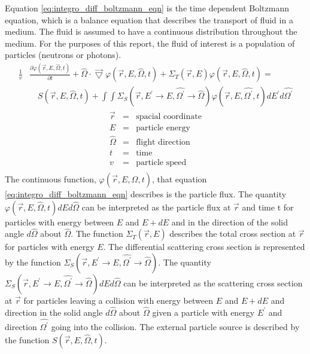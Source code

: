 Equation \ref{eq:integro_diff_boltzmann_eqn} is the time dependent Boltzmann
equation, which is a balance equation that describes the transport of fluid
in a medium. The fluid is assumed to have a continuous distribution throughout
the medium. For the purposes of this report, the fluid of interest is a
population of particles (neutrons or photons). 
\begin{equation}
  \begin{split}
    \frac{1}{v}&\frac{\partial \varphi(\vec{r},E,\hat{\Omega},t)}{\partial t} +
    \hat{\Omega} \cdot \vec{\bigtriangledown} \varphi(\vec{r},E,\hat{\Omega},t)
    + \Sigma_T(\vec{r},E) \varphi(\vec{r},E,\hat{\Omega},t) = \\
    & \quad S(\vec{r},E,\hat{\Omega},t) +
    \int\int \Sigma_S(\vec{r},E^{'} \to E,\hat{\Omega^{'}} \to \hat{\Omega})
    \varphi(\vec{r},E,\hat{\Omega^{'}},t) dE^{'}d\hat{\Omega^{'}} 
  \end{split}
  \label{eq:integro_diff_boltzmann_eqn}
\end{equation}
\begin{eqnarray*}
  \vec{r} & = & \text{spacial coordinate} \nonumber \\
  E & = & \text{particle energy} \nonumber \\
  \hat{\Omega} & = & \text{flight direction} \nonumber \\
  t & = & \text{time} \nonumber \\
  v & = & \text{particle speed} \nonumber \\
\end{eqnarray*}
The continuous function, $\varphi(\vec{r},E,\hat{\Omega},t)$, that equation 
\ref{eq:integro_diff_boltzmann_eqn} describes is the particle flux. The
quantity $\varphi(\vec{r},E,\hat{\Omega},t)dEd\hat{\Omega}$ can be interpreted
as the particle flux at $\vec{r}$ and time t for particles with energy between
$E$ and $E + dE$ and in the direction of the solid angle $d\hat{\Omega}$ about
$\hat{\Omega}$. The function $\Sigma_T(\vec{r},E)$ describes the total cross
section at $\vec{r}$ for particles with energy $E$. The differential scattering
cross section is represented by the function 
$\Sigma_S(\vec{r},E^{'} \to E,\hat{\Omega^{'}} \to \hat{\Omega})$. The quantity
$\Sigma_S(\vec{r},E^{'} \to E,\hat{\Omega^{'}} \to \hat{\Omega})dEd\hat{\Omega}$
can be interpreted as the scattering cross section at $\vec{r}$ for particles
leaving a collision with energy between $E$ and $E+dE$ and direction in the
solid angle $d\hat{\Omega}$ about $\hat{\Omega}$ given a particle with energy
$E^{'}$ and direction $\hat{\Omega^{'}}$ going into the collision. The external
particle source is described by the function $S(\vec{r},E,\hat{\Omega},t)$.

